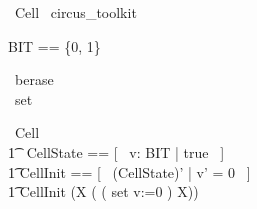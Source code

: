 
\begin{zsection}
	\SECTION\ Cell \parents\ circus\_toolkit
\end{zsection}

\begin{zed}
	BIT == \{0, 1\} \\      %
\end{zed}

\begin{circus}
	\circchannel\ berase\\
	\circchannel\ set\\
\end{circus}

\begin{circus}
	\circprocess\ Cell \circdef \circbegin \\
		\t1 \circstate\ CellState == [~ v: BIT | true ~] \\
    	\t1	CellInit == [~ (CellState)' | v' = 0 ~] \\
	\t1 \circspot \lschexpract CellInit \rschexpract \circseq (\circmu X \circspot (
        (
            set \then v:=0
        ) 
        \circseq X)) \\
	\circend
\end{circus}
